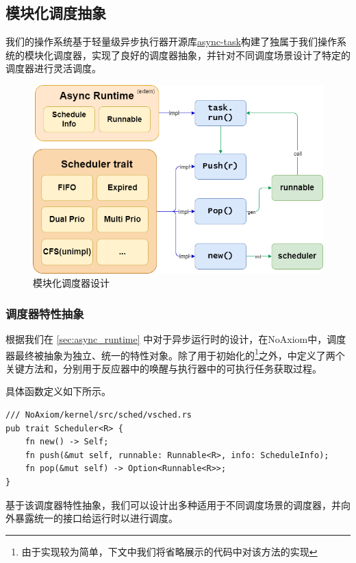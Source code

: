 \documentclass{article}
\begin{document}
\subsection{模块化调度抽象}

我们的操作系统基于轻量级异步执行器开源库\href{https://github.com/smol-rs/async-task}{async-task}构建了独属于我们操作系统的模块化调度器，实现了良好的调度器抽象，并针对不同调度场景设计了特定的调度器进行灵活调度。

\begin{figure}[H]
    \centering
    \includegraphics[width=0.8\linewidth]{assets//sched/scheduler_types.drawio.png}
    \caption{模块化调度器设计}
    \label{fig:async_runtime}
\end{figure}

\subsubsection{调度器特性抽象}

根据我们在 \ref{sec:async_runtime} 中对于异步运行时的设计，在NoAxiom中，调度器最终被抽象为独立、统一的特性对象。除了用于初始化的\footnote{由于实现较为简单，下文中我们将省略展示的代码中对该方法的实现}之外，中定义了两个关键方法和，分别用于反应器中的唤醒与执行器中的可执行任务获取过程。

具体函数定义如下所示。

\begin{lstlisting}
/// NoAxiom/kernel/src/sched/vsched.rs
pub trait Scheduler<R> {
    fn new() -> Self;
    fn push(&mut self, runnable: Runnable<R>, info: ScheduleInfo);
    fn pop(&mut self) -> Option<Runnable<R>>;
}
\end{lstlisting}

基于该调度器特性抽象，我们可以设计出多种适用于不同调度场景的调度器，并向外暴露统一的接口给运行时以进行调度。
\end{document}
